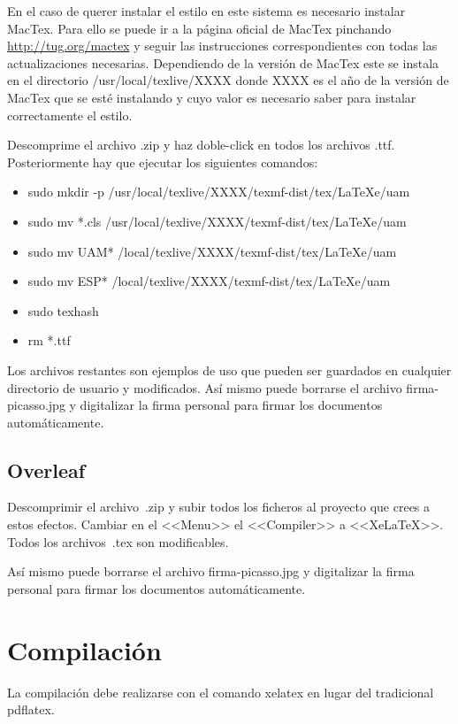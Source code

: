\documentclass[numerado,carta]{plantillasEPS} %
\begin{document}
En el caso de querer instalar el estilo en este sistema es necesario instalar MacTex. Para ello se puede ir a la página oficial de MacTex pinchando \href{aquí}{http://tug.org/mactex} y seguir las instrucciones correspondientes con todas las actualizaciones necesarias. Dependiendo de la versión de MacTex este se instala en el directorio /usr/local/texlive/XXXX donde XXXX es el año de la versión de MacTex que se esté instalando y cuyo valor es necesario saber para instalar correctamente el estilo.

Descomprime el archivo .zip y haz doble-click en todos los archivos .ttf. Posteriormente hay que ejecutar los siguientes comandos:
\begin{itemize}
    \item sudo mkdir -p /usr/local/texlive/XXXX/texmf-dist/tex/LaTeXe/uam
    \item sudo mv *.cls /usr/local/texlive/XXXX/texmf-dist/tex/LaTeXe/uam
    \item sudo mv UAM* /local/texlive/XXXX/texmf-dist/tex/LaTeXe/uam
    \item sudo mv ESP* /local/texlive/XXXX/texmf-dist/tex/LaTeXe/uam
    \item sudo texhash
    \item rm *.ttf
\end{itemize}

Los archivos restantes son ejemplos de uso que pueden ser guardados en cualquier directorio de usuario y modificados. Así mismo puede borrarse el archivo firma-picasso.jpg y digitalizar la firma personal para firmar los documentos automáticamente.


\section{Overleaf}
Descomprimir el archivo\ .zip y subir todos los ficheros al proyecto que crees a estos efectos. Cambiar en el <<Menu>> el <<Compiler>> a <<XeLaTeX>>. Todos los archivos\ .tex son modificables.

Así mismo puede borrarse el archivo firma-picasso.jpg y digitalizar la firma personal para firmar los documentos automáticamente.
    
\chapter{Compilación}

La compilación debe realizarse con el comando xelatex en lugar del tradicional pdflatex.
\end{document}
